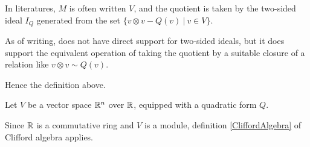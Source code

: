 \begin{remark}
  \label{mk:two_sided_ideals}
  
  In literatures, $M$ is often written $V$, and the quotient is taken by the two-sided ideal $I_Q$ generated from the set
  $\{ v \otimes v - Q(v) \:\vert\: v \in V \}$.

  As of writing, \Mathlib does not have direct support for two-sided ideals,
  but it does support the equivalent operation of taking the quotient by a suitable closure of
  a relation like $v \otimes v \sim Q(v)$.

  Hence the definition above.

\end{remark}

\begin{example}
  \label{ex:clifford_algebra_v}

  Let $V$ be a vector space $\mathbb R^n$ over $\mathbb R$, equipped with a quadratic form $Q$.
  
  Since $\mathbb R$ is a commutative ring and $V$ is a module,
  definition \ref{CliffordAlgebra} of Clifford algebra applies.
\end{example}
